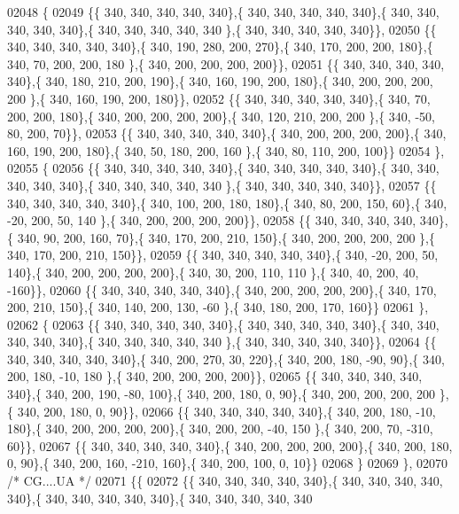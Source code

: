 \begin{DoxyCode}
02048 \{
02049 \{\{ 340, 340, 340, 340, 340\},\{ 340, 340, 340, 340, 340\},\{ 340, 340, 340, 340, 340\},\{ 340, 340, 340, 340, 340
      \},\{ 340, 340, 340, 340, 340\}\},
02050 \{\{ 340, 340, 340, 340, 340\},\{ 340, 190, 280, 200, 270\},\{ 340, 170, 200, 200, 180\},\{ 340,  70, 200, 200, 180
      \},\{ 340, 200, 200, 200, 200\}\},
02051 \{\{ 340, 340, 340, 340, 340\},\{ 340, 180, 210, 200, 190\},\{ 340, 160, 190, 200, 180\},\{ 340, 200, 200, 200, 200
      \},\{ 340, 160, 190, 200, 180\}\},
02052 \{\{ 340, 340, 340, 340, 340\},\{ 340,  70, 200, 200, 180\},\{ 340, 200, 200, 200, 200\},\{ 340, 120, 210, 200, 200
      \},\{ 340, -50,  80, 200,  70\}\},
02053 \{\{ 340, 340, 340, 340, 340\},\{ 340, 200, 200, 200, 200\},\{ 340, 160, 190, 200, 180\},\{ 340,  50, 180, 200, 160
      \},\{ 340,  80, 110, 200, 100\}\}
02054 \},
02055 \{
02056 \{\{ 340, 340, 340, 340, 340\},\{ 340, 340, 340, 340, 340\},\{ 340, 340, 340, 340, 340\},\{ 340, 340, 340, 340, 340
      \},\{ 340, 340, 340, 340, 340\}\},
02057 \{\{ 340, 340, 340, 340, 340\},\{ 340, 100, 200, 180, 180\},\{ 340,  80, 200, 150,  60\},\{ 340, -20, 200,  50, 140
      \},\{ 340, 200, 200, 200, 200\}\},
02058 \{\{ 340, 340, 340, 340, 340\},\{ 340,  90, 200, 160,  70\},\{ 340, 170, 200, 210, 150\},\{ 340, 200, 200, 200, 200
      \},\{ 340, 170, 200, 210, 150\}\},
02059 \{\{ 340, 340, 340, 340, 340\},\{ 340, -20, 200,  50, 140\},\{ 340, 200, 200, 200, 200\},\{ 340,  30, 200, 110, 110
      \},\{ 340,  40, 200,  40, -160\}\},
02060 \{\{ 340, 340, 340, 340, 340\},\{ 340, 200, 200, 200, 200\},\{ 340, 170, 200, 210, 150\},\{ 340, 140, 200, 130, -60
      \},\{ 340, 180, 200, 170, 160\}\}
02061 \},
02062 \{
02063 \{\{ 340, 340, 340, 340, 340\},\{ 340, 340, 340, 340, 340\},\{ 340, 340, 340, 340, 340\},\{ 340, 340, 340, 340, 340
      \},\{ 340, 340, 340, 340, 340\}\},
02064 \{\{ 340, 340, 340, 340, 340\},\{ 340, 200, 270,  30, 220\},\{ 340, 200, 180, -90,  90\},\{ 340, 200, 180, -10, 180
      \},\{ 340, 200, 200, 200, 200\}\},
02065 \{\{ 340, 340, 340, 340, 340\},\{ 340, 200, 190, -80, 100\},\{ 340, 200, 180,   0,  90\},\{ 340, 200, 200, 200, 200
      \},\{ 340, 200, 180,   0,  90\}\},
02066 \{\{ 340, 340, 340, 340, 340\},\{ 340, 200, 180, -10, 180\},\{ 340, 200, 200, 200, 200\},\{ 340, 200, 200, -40, 150
      \},\{ 340, 200,  70, -310,  60\}\},
02067 \{\{ 340, 340, 340, 340, 340\},\{ 340, 200, 200, 200, 200\},\{ 340, 200, 180,   0,  90\},\{ 340, 200, 160, -210, 
      160\},\{ 340, 200, 100,   0,  10\}\}
02068 \}
02069 \},
02070 \textcolor{comment}{/* CG....UA */}
02071 \{\{
02072 \{\{ 340, 340, 340, 340, 340\},\{ 340, 340, 340, 340, 340\},\{ 340, 340, 340, 340, 340\},\{ 340, 340, 340, 340, 340

\end{DoxyCode}
